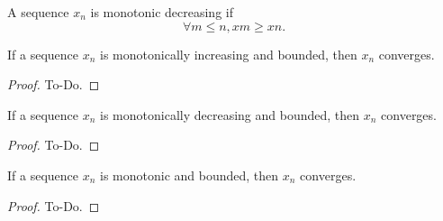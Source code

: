 \begin{definition}\label{def:seqmonodec}
     \leanok
    A sequence $x_n$ is monotonic decreasing if
    \[
    \forall m \leq n, x m \geq x n.
    \]
\end{definition}

\begin{theorem}\label{thm:seq_bound_monoinc_conv}
    If a sequence $x_n$ is monotonically increasing and bounded,
    then $x_n$ converges.
\end{theorem}
\begin{proof}
    To-Do.
\end{proof}

\begin{theorem}\label{thm:seq_bound_monodec_conv}
    If a sequence $x_n$ is monotonically decreasing and bounded,
    then $x_n$ converges.
\end{theorem}
\begin{proof}
    To-Do.
\end{proof}

\begin{theorem}\label{thm:seq_mono_conv}
    If a sequence $x_n$ is monotonic and bounded,
    then $x_n$ converges.
\end{theorem}
\begin{proof}
    To-Do.
\end{proof}